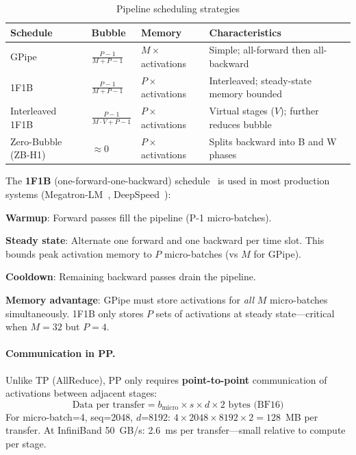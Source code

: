 \begin{table}[ht!]
\centering
\caption{Pipeline scheduling strategies}
\begin{tabular}{@{}lp{3.5cm}p{3.5cm}p{6cm}@{}}
\toprule
\textbf{Schedule} & \textbf{Bubble} & \textbf{Memory} & \textbf{Characteristics} \\
\midrule
GPipe & $\frac{P-1}{M+P-1}$ & $M \times$ activations & Simple; all-forward then all-backward~\cite{huang2019gpipe} \\
1F1B & $\frac{P-1}{M+P-1}$ & $P \times$ activations & Interleaved; steady-state memory bounded~\cite{narayanan2019pipedream} \\
Interleaved 1F1B & $\frac{P-1}{M \cdot V + P - 1}$ & $P \times$ activations & Virtual stages ($V$); further reduces bubble~\cite{narayanan2021efficient} \\
Zero-Bubble (ZB-H1) & $\approx 0$ & $P \times$ activations & Splits backward into B and W phases~\cite{qi2023zerobubble} \\
\bottomrule
\end{tabular}
\end{table}

\begin{intuitionbox}
The \textbf{1F1B} (one-forward-one-backward) schedule~\cite{narayanan2019pipedream} is used in most production systems (Megatron-LM~\cite{narayanan2021efficient}, DeepSpeed~\cite{rajbhandari2020zero}):

\textbf{Warmup}: Forward passes fill the pipeline (P-1 micro-batches).

\textbf{Steady state}: Alternate one forward and one backward per time slot. This bounds peak activation memory to $P$ micro-batches (vs $M$ for GPipe).

\textbf{Cooldown}: Remaining backward passes drain the pipeline.

\textbf{Memory advantage}: GPipe must store activations for \emph{all} $M$ micro-batches simultaneously. 1F1B only stores $P$ sets of activations at steady state---critical when $M = 32$ but $P = 4$.
\end{intuitionbox}

\paragraph{Communication in PP.}
\label{communication-in-pp.}

Unlike TP (AllReduce), PP only requires \textbf{point-to-point} communication of activations between adjacent stages: 
\begin{equation}
\text{Data per transfer} = b_\text{micro} \times s \times d \times 2\text{ bytes (BF16)}
\end{equation}
 For micro-batch=4, seq=2048, $d$=8192: $4 \times 2048 \times 8192 \times 2 = 128$~MB per transfer. At InfiniBand 50~GB/s: 2.6~ms per transfer---small relative to compute per stage.

